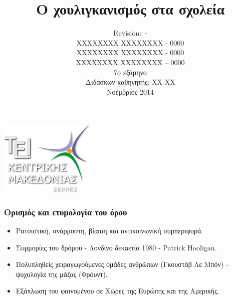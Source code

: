 \documentclass[hyperref={pdfpagelabels=false}, t]{beamer}
\title{Ο χουλιγκανισμός στα σχολεία}
\author[Παιδαγωγικά]{Revision: \gitReln \,- \gitAbbrevHash \\ XXXXXXXX
XXXXXXXX  - 0000 \\ XXXXXXXX XXXXXXXX - 0000 \\ XXXXXXXX XXXXXXXX – 0000
\vspace{5.5pt} \\ 7ο εξάμηνο \\ Διδάσκων καθηγητής: XX XX
\\Νοέμβριος 2014 }
\date{}
\let\olditem=\item%
\renewcommand{\item}{\olditem \justifying}%
\begin{document}
\begin{frame}[t]
\vspace{1.5pt}
\centering\includegraphics[scale=0.5]{logo}
\vspace{5.5pt}
\titlepage
\end{frame} 


%
%

\begin{frame}[fragile,t]%
    \begin{minipage}[t]{0.99\textwidth}
\frametitle{Ορισμός και ετυμολογία του όρου}
\vspace{-18.5pt} %

\begin{adjustwidth}{-0.7cm}{} %
\justifying
\begin{itemize} %
\item Ρατσιστική, ανάρμοστη, βίαιαη και
αντικοινωνική συμπεριφορά.\setlength{\itemsep}{15pt}
\item Συμμορίες του δρόμου - Λονδίνο δεκαετία
1980 - Patrick Hooligan. \setlength{\itemsep}{15pt}
\item Πολυπληθείς χειραγωγούμενες ομάδες ανθρώπων (Γκουστάβ Λε Μπόν) - ψυχολογία
της μάζας (Φρόυντ). \setlength{\itemsep}{15pt}
\item\setlength{\itemsep}{15pt}Εξάπλωση του φαινομένου σε Χώρες της Ευρώπης και
της Αμερικής.
\end{itemize}
\end{adjustwidth}
\end{minipage}
\end{frame}
\end{document}
